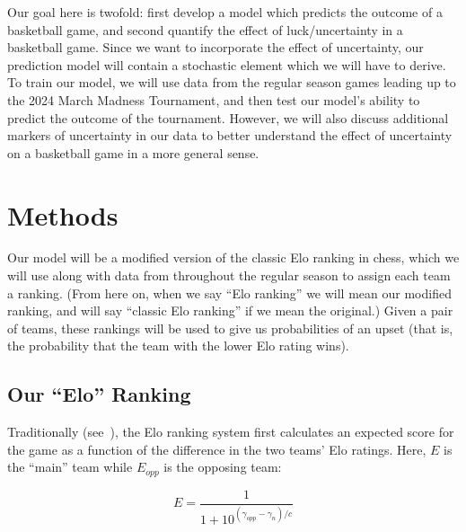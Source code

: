 \documentclass{article}
\begin{document}
Our goal here is twofold: first develop a model which predicts the outcome of a basketball game, and second quantify the effect of luck/uncertainty in a basketball game. Since we want to incorporate the effect of uncertainty, our prediction model will contain a stochastic element which we will have to derive. To train our model, we will use data from the regular season games leading up to the 2024 March Madness Tournament, and then test our model's ability to predict the outcome of the tournament. However, we will also discuss additional markers of uncertainty in our data to better understand the effect of uncertainty on a basketball game in a more general sense. 


\section{Methods}

Our model will be a modified version of the classic Elo ranking in chess, which we will use along with data from throughout the regular season to assign each team a ranking. (From here on, when we say ``Elo ranking'' we will mean our modified ranking, and will say ``classic Elo ranking'' if we mean the original.) Given a pair of teams, these rankings will be used to give us probabilities of an upset (that is, the probability that the team with the lower Elo rating wins). 


\subsection{Our ``Elo'' Ranking}
Traditionally (see~\cite{mediumRatingSystem}), the Elo ranking system first calculates an expected score for the game as a function of the difference in the two teams' Elo ratings. Here, $E$ is the ``main'' team while $E_{opp}$ is the opposing team:

\begin{equation}\label{eq:E}
E = \frac{1}{1+10^{(\gamma_{opp}-\gamma_n)/c}}
\end{equation}
\end{document}
